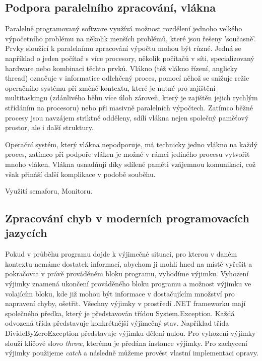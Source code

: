 \subsection{Podpora paralelního zpracování, vlákna}
Paralelně programovaný software využívá možnost rozdělení jednoho velkého výpočetního problému na několik menších problémů, které jsou řešeny 'současně'. Prvky sloužící k paralelnímu zpracování výpočtu mohou být různé. Jedná se například o jeden počítač s více procesory, několik počítačů v síti, specializovaný hardware nebo kombinaci těchto prvků.
Vlákno (též vlákno řízení, anglicky thread) označuje v informatice odlehčený proces, pomocí něhož se snižuje režie operačního systému při změně kontextu, které je nutné pro zajištění multitaskingu (zdánlivého běhu více úloh zároveň, který je zajištěn jejich rychlým střídáním na procesoru) nebo při masivně paralelních výpočtech. Zatímco běžné procesy jsou navzájem striktně odděleny, sdílí vlákna nejen společný paměťový prostor, ale i další struktury.

Operační systém, který vlákna nepodporuje, má technicky jedno vlákno na každý proces, zatímco při podpoře vláken je možné v rámci jediného procesu vytvořit mnoho vláken. Vlákna usnadňují díky sdílené paměti vzájemnou komunikaci, což však přináší další komplikace v podobě souběhu.

Využití semaforu, Monitoru.

\subsection{Zpracování chyb v moderních programovacích jazycích}

Pokud v průběhu programu dojde k výjimečné situaci, pro kterou v daném kontextu nemáme dostatek informací, abychom ji mohli hned na místě vyřešit a pokračovat v právě prováděném bloku programu, vyhodíme výjimku. Vyhození výjimky znamená ukončení prováděného bloku programu a možnost výjimku ve volajícím bloku, kde již mohou být informace v dostačujícím množství pro napravení chyby, ošetřit.
Všechny výjimky v prostředí .NET frameworku mají společného předka, který je představován třídou System.Exception. Každá odvozená třída představuje konkrétnější výjimečný stav. Například třída DivideByZeroException představuje výjimku dělení nulou. Pro vyhozeni výjimky slouží klíčové slovo \textit{throw}, kterému je předána instance výjimky. Pro zachycení výjimky použijeme \textit{catch} a následně můžeme provést vlastní implementaci opravy.
